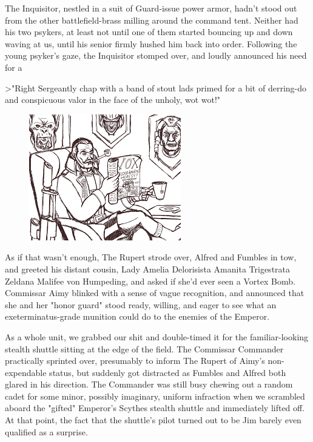 The Inquisitor, nestled in a suit of Guard-issue power armor, hadn't stood out from the other battlefield-brass milling around the command tent. 
Neither had his two psykers, at least not until one of them started bouncing up and down waving at us, until his senior firmly hushed him back into order. 
Following the young psyker's gaze, the Inquisitor stomped over, and loudly announced his need for a 

>"Right Sergeantly chap with a band of stout lads primed for a bit of derring-do and conspicuous valor in the face of the unholy, wot wot!"

\begin{figure}
	\begin{center}
		\includegraphics[width=\figwidth]{pics/21/124.png}
	\end{center}
\end{figure}
As if that wasn't enough, The Rupert strode over, Alfred and Fumbles in tow, and greeted his distant cousin, Lady Amelia Delorisista Amanita Trigestrata Zeldana Malifee von Humpeding, and asked if she'd ever seen a Vortex Bomb. 
Commissar Aimy blinked with a sense of vague recognition, and announced that she and her "honor guard" stood ready, willing, and eager to see what an exeterminatus-grade munition could do to the enemies of the Emperor. 


As a whole unit, we grabbed our shit and double-timed it for the familiar-looking stealth shuttle sitting at the edge of the field. 
The Commissar Commander practically sprinted over, presumably to inform The Rupert of Aimy's non-expendable status, but suddenly got distracted as Fumbles and Alfred both glared in his direction. 
The Commander was still busy chewing out a random cadet for some minor, possibly imaginary, uniform infraction when we scrambled aboard the "gifted" Emperor's Scythes stealth shuttle and immediately lifted off. 
At that point, the fact that the shuttle's pilot turned out to be Jim barely even qualified as a surprise. 



